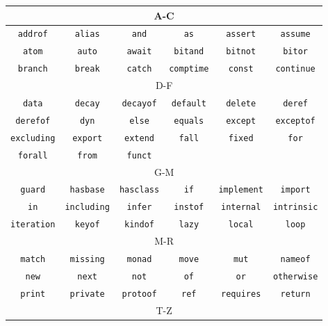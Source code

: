 \begin{table}[h]
	\centering
	\begin{tabular}{|c c c c c c|} \hline
		\multicolumn{6}{|c|}{A-C} \\\hline
		\lstinline!addrof! & \lstinline!alias! & \lstinline!and! & \lstinline!as! & \lstinline!assert! & \lstinline!assume! \\
		\lstinline!atom! & \lstinline!auto! & \lstinline!await! & \lstinline!bitand! & \lstinline!bitnot! & \lstinline!bitor! \\
		\lstinline!branch! & \lstinline!break! & \lstinline!catch! & \lstinline!comptime! & \lstinline!const! & \lstinline!continue! \\\hline
		\multicolumn{6}{|c|}{D-F} \\\hline
		\lstinline!data! & \lstinline!decay! & \lstinline!decayof! & \lstinline!default! & \lstinline!delete! & \lstinline!deref! \\
		\lstinline!derefof! & \lstinline!dyn! & \lstinline!else! & \lstinline!equals! & \lstinline!except! & \lstinline!exceptof! \\
		\lstinline!excluding! & \lstinline!export! & \lstinline!extend! & \lstinline!fall! & \lstinline!fixed! & \lstinline!for! \\
		\lstinline!forall! & \lstinline!from! & \lstinline!funct! & & & \\\hline
		\multicolumn{6}{|c|}{G-M} \\\hline
		\lstinline!guard! & \lstinline!hasbase! & \lstinline!hasclass! & \lstinline!if! & \lstinline!implement! & \lstinline!import! \\
		\lstinline!in! & \lstinline!including! & \lstinline!infer! & \lstinline!instof! & \lstinline!internal! & \lstinline!intrinsic! \\
		\lstinline!iteration! & \lstinline!keyof! & \lstinline!kindof! & \lstinline!lazy! & \lstinline!local! & \lstinline!loop! \\\hline
		\multicolumn{6}{|c|}{M-R} \\\hline
		\lstinline!match! & \lstinline!missing! & \lstinline!monad! & \lstinline!move! & \lstinline!mut! & \lstinline!nameof! \\
	    \lstinline!new! & \lstinline!next! & \lstinline!not! & \lstinline!of! & \lstinline!or! & \lstinline!otherwise! \\
		 \lstinline!print! & \lstinline!private! & \lstinline!protoof! & \lstinline!ref! & \lstinline!requires! & \lstinline!return! \\\hline
		\multicolumn{6}{|c|}{T-Z} \\\hline

\end{tabular}
\end{table}
